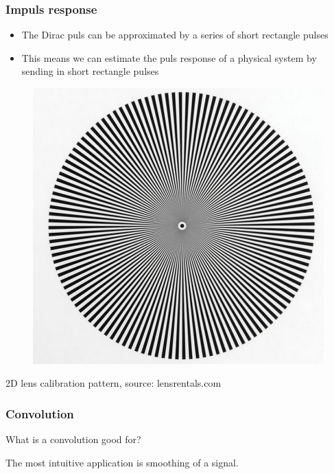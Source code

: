 \begin{frame}%
    \frametitle{Impuls response}
    \begin{itemize}
        \item The Dirac puls can be approximated by a series of short rectangle pulses
        \item This means we can estimate the puls response of a physical system by sending in short rectangle pulses
    \end{itemize}
    \begin{figure}
         \includegraphics[width=.3\linewidth]{images/2DDirac.jpg}
    \end{figure}
    \scriptsize 2D lens calibration pattern, source: lensrentals.com $\quad$
\end{frame}



\begin{frame}
    \frametitle{Convolution}
    \question{} What is a convolution good for?\newline

    \answer{} The most intuitive application is smoothing of a signal.\newline

    \begin{figure}[htpb]
        \begin{center}
        \end{center}
        \caption{}
        \label{fig:}
    \end{figure}


\end{frame}

